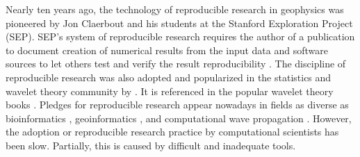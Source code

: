 Nearly ten years ago, the technology of reproducible research in
geophysics was pioneered by Jon Claerbout and his students at the
Stanford Exploration Project (SEP).  SEP's system of reproducible
research requires the author of a publication to document creation of
numerical results from the input data and software sources to let
others test and verify the result reproducibility
\cite[]{SEG-1992-0601,matt}.
The discipline of reproducible research was also adopted and
popularized in the statistics and wavelet theory community by
\cite{donoho}. It is referenced in the popular wavelet theory books
\cite[]{hubbard,mallat}. Pledges for reproducible research appear
nowadays in fields as diverse as bioinformatics \cite[]{bioconductor},
geoinformatics \cite[]{geo}, and computational wave propagation
\cite[]{randy}. However, the adoption or reproducible research
practice by computational scientists has been slow.  Partially, this
is caused by difficult and inadequate tools.



